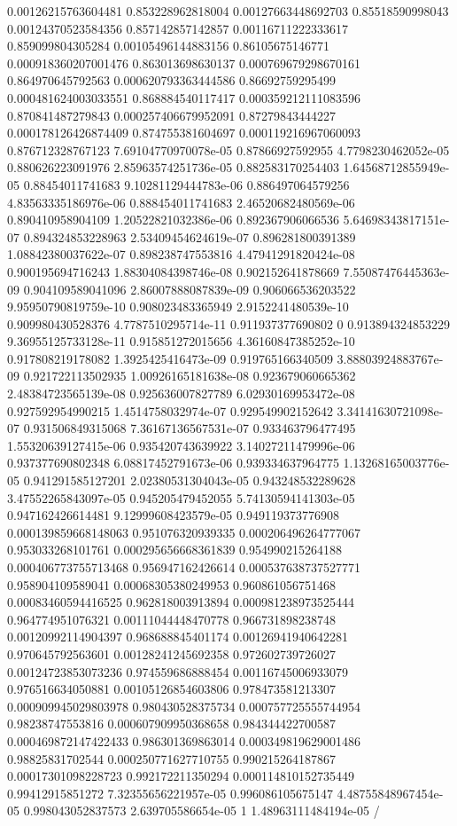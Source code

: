 \begin{table}
\begin{tabu}
\begin{sparkline}{10}
0.00126215763604481 0.853228962818004 0.00127663448692703 0.85518590998043 0.00124370523584356 0.857142857142857 0.00116711222333617 0.859099804305284 0.00105496144883156 0.86105675146771 0.000918360207001476 0.863013698630137 0.000769679298670161 0.864970645792563 0.000620793363444586 0.86692759295499 0.000481624003033551 0.868884540117417 0.000359212111083596 0.870841487279843 0.000257406679952091 0.87279843444227 0.000178126426874409 0.874755381604697 0.000119216967060093 0.876712328767123 7.69104770970078e-05 0.87866927592955 4.7798230462052e-05 0.880626223091976 2.85963574251736e-05 0.882583170254403 1.64568712855949e-05 0.88454011741683 9.10281129444783e-06 0.886497064579256 4.83563335186976e-06 0.888454011741683 2.46520682480569e-06 0.890410958904109 1.20522821032386e-06 0.892367906066536 5.64698343817151e-07 0.894324853228963 2.53409454624619e-07 0.896281800391389 1.08842380037622e-07 0.898238747553816 4.47941291820424e-08 0.900195694716243 1.88304084398746e-08 0.902152641878669 7.55087476445363e-09 0.904109589041096 2.86007888087839e-09 0.906066536203522 9.95950790819759e-10 0.908023483365949 2.9152241480539e-10 0.909980430528376 4.7787510295714e-11 0.911937377690802 0 0.913894324853229 9.36955125733128e-11 0.915851272015656 4.36160847385252e-10 0.917808219178082 1.3925425416473e-09 0.919765166340509 3.88803924883767e-09 0.921722113502935 1.00926165181638e-08 0.923679060665362 2.48384723565139e-08 0.925636007827789 6.02930169953472e-08 0.927592954990215 1.4514758032974e-07 0.929549902152642 3.34141630721098e-07 0.931506849315068 7.36167136567531e-07 0.933463796477495 1.55320639127415e-06 0.935420743639922 3.14027211479996e-06 0.937377690802348 6.08817452791673e-06 0.939334637964775 1.13268165003776e-05 0.941291585127201 2.02380531304043e-05 0.943248532289628 3.47552265843097e-05 0.945205479452055 5.74130594141303e-05 0.947162426614481 9.12999608423579e-05 0.949119373776908 0.000139859668148063 0.951076320939335 0.000206496264777067 0.953033268101761 0.000295656668361839 0.954990215264188 0.000406773755713468 0.956947162426614 0.000537638737527771 0.958904109589041 0.00068305380249953 0.960861056751468 0.00083460594416525 0.962818003913894 0.000981238973525444 0.964774951076321 0.00111044448470778 0.966731898238748 0.00120992114904397 0.968688845401174 0.00126941940642281 0.970645792563601 0.00128241245692358 0.972602739726027 0.00124723853073236 0.974559686888454 0.00116745006933079 0.976516634050881 0.00105126854603806 0.978473581213307 0.000909945029803978 0.980430528375734 0.000757725555744954 0.98238747553816 0.000607909950368658 0.984344422700587 0.000469872147422433 0.986301369863014 0.000349819629001486 0.98825831702544 0.000250771627710755 0.990215264187867 0.00017301098228723 0.992172211350294 0.000114810152735449 0.99412915851272 7.32355656221957e-05 0.996086105675147 4.48755848967454e-05 0.998043052837573 2.639705586654e-05 1 1.48963111484194e-05 /

\end{sparkline}
\end{tabu}
\end{table}
